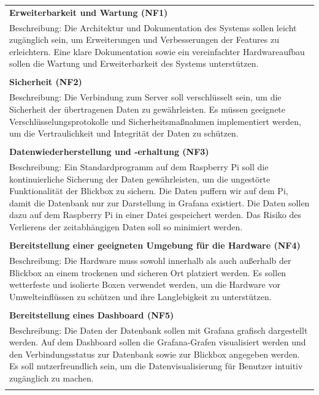 \documentclass[
]{article}
\begin{document}
\begin{center}
  \begin{tabular}{|p{\linewidth}|}
    \hline
    \textbf{Erweiterbarkeit und Wartung (NF1)} \\
    Beschreibung: Die Architektur und Dokumentation des Systems sollen leicht zugänglich sein, um Erweiterungen und Verbesserungen der Features zu erleichtern.
    Eine klare Dokumentation sowie ein vereinfachter Hardwareaufbau sollen die Wartung und Erweiterbarkeit des Systems unterstützen. \\ \\
    \hline
    \textbf{Sicherheit (NF2)} \\
    Beschreibung: Die Verbindung zum Server soll verschlüsselt sein, um die Sicherheit der übertragenen Daten zu gewährleisten.
    Es müssen geeignete Verschlüsselungsprotokolle und Sicherheitsmaßnahmen implementiert werden, um die Vertraulichkeit und Integrität der Daten zu schützen.\\ \\
    \hline
    \textbf{Datenwiederherstellung und -erhaltung (NF3)} \\
    Beschreibung: Ein Standardprogramm auf dem Raspberry Pi soll die kontinuierliche Sicherung der Daten gewährleisten, um die ungestörte Funktionalität der Blickbox zu sichern.
    Die Daten puffern wir auf dem Pi, damit die Datenbank nur zur Darstellung in Grafana existiert.
    Die Daten sollen dazu auf dem Raspberry Pi in einer Datei gespeichert werden.
    Das Risiko des Verlierens der zeitabhängigen Daten soll so minimiert werden.\\ \\
    \hline
    \textbf{Bereitstellung einer geeigneten Umgebung für die Hardware (NF4)} \\
    Beschreibung: Die Hardware muss sowohl innerhalb als auch außerhalb der Blickbox an einem trockenen und sicheren Ort platziert werden.
    Es sollen wetterfeste und isolierte Boxen verwendet werden, um die Hardware vor Umwelteinflüssen zu schützen und ihre Langlebigkeit zu unterstützen.\\ \\
    \hline
    \textbf{Bereitstellung eines Dashboard (NF5)} \\
    Beschreibung: Die Daten der Datenbank sollen mit Grafana grafisch dargestellt werden.
    Auf dem Dashboard sollen die Grafana-Grafen visualisiert werden und den Verbindungsstatus zur Datenbank sowie zur Blickbox angegeben werden.
    Es soll nutzerfreundlich sein, um die Datenvisualisierung für Benutzer intuitiv zugänglich zu machen.
    \\ \\
    \hline
  \end{tabular}
\end{center}
\end{document}
